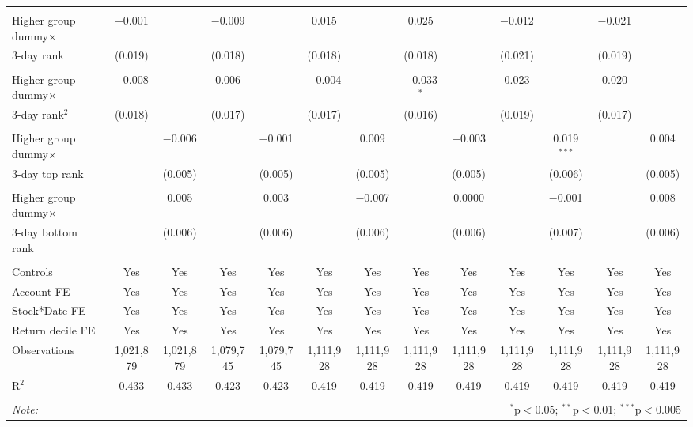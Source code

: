\begin{tabular}{@{\extracolsep{2pt}}lcccccccccccc}
& & & & & & & & & & & & \\ 
Higher group dummy$\times$ & $-$0.001 &  & $-$0.009 &  & 0.015 &  & 0.025 &  & $-$0.012 &  & $-$0.021 &  \\ 
3-day rank & (0.019) &  & (0.018) &  & (0.018) &  & (0.018) &  & (0.021) &  & (0.019) &  \\ 
& & & & & & & & & & & & \\ 
Higher group dummy$\times$  & $-$0.008 &  & 0.006 &  & $-$0.004 &  & $-$0.033$^{*}$ &  & 0.023 &  & 0.020 &  \\ 
3-day rank$^2$& (0.018) &  & (0.017) &  & (0.017) &  & (0.016) &  & (0.019) &  & (0.017) &  \\ 
& & & & & & & & & & & & \\
Higher group dummy$\times$ &  & $-$0.006 &  & $-$0.001 &  & 0.009 &  & $-$0.003 &  & 0.019$^{***}$ &  & 0.004 \\ 
3-day top rank &  & (0.005) &  & (0.005) &  & (0.005) &  & (0.005) &  & (0.006) &  & (0.005) \\ 
& & & & & & & & & & & & \\   
Higher group dummy$\times$ &  & 0.005 &  & 0.003 &  & $-$0.007 &  & 0.0000 &  & $-$0.001 &  & 0.008 \\ 
3-day bottom rank&  & (0.006) &  & (0.006) &  & (0.006) &  & (0.006) &  & (0.007) &  & (0.006) \\

\hline \\[-1.8ex] 
Controls & Yes & Yes & Yes & Yes & Yes & Yes  & Yes & Yes & Yes & Yes & Yes & Yes \\ 
Account FE & Yes & Yes & Yes & Yes & Yes & Yes  & Yes & Yes & Yes & Yes & Yes & Yes \\ 
Stock*Date FE & Yes & Yes & Yes & Yes & Yes & Yes  & Yes & Yes & Yes & Yes & Yes & Yes  \\ 
Return decile FE & Yes & Yes & Yes & Yes & Yes & Yes  & Yes & Yes & Yes & Yes & Yes & Yes\\ 
Observations & 1,021,879 & 1,021,879 & 1,079,745 & 1,079,745 & 1,111,928 & 1,111,928 & 1,111,928 & 1,111,928 & 1,111,928 & 1,111,928 & 1,111,928 & 1,111,928 \\ 

R$^{2}$ & 0.433 & 0.433 & 0.423 & 0.423 & 0.419 & 0.419 & 0.419 & 0.419 & 0.419 & 0.419 & 0.419 & 0.419 \\ 

\hline 
\hline \\[-1.8ex] 
\textit{Note:}  & \multicolumn{12}{r}{$^{*}$p$<$0.05; $^{**}$p$<$0.01; $^{***}$p$<$0.005} \\ 
\end{tabular} 

